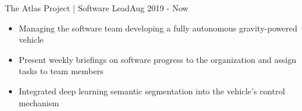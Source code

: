 
\begin{projects}

    \extracurricular
    {The Atlas Project | Software Lead}{Aug 2019 - Now}
    {
	    \begin{itemize}
    	    \item Managing the software team developing a fully autonomous gravity-powered vehicle
    	    \item Present weekly briefings on software progress to the organization and assign tasks to team members
    	    \item Integrated deep learning semantic segmentation into the vehicle's control mechanism
		\end{itemize}
    }
	\\



\end{projects}
